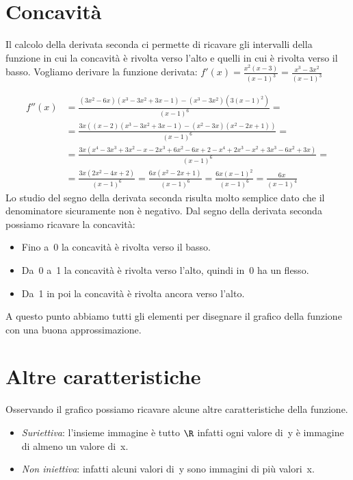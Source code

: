 \section{Concavità}
\label{sec:04_concavita}
Il calcolo della derivata seconda ci permette di ricavare gli intervalli 
della funzione in cui la concavità è rivolta verso l'alto e quelli in cui è 
rivolta verso il basso. Vogliamo derivare la funzione derivata:
\(f'(x)=\frac{x^2(x-3)}{(x-1)^3}=\frac{x^3-3x^2}{(x-1)^3}\)

\begin{align*}
f''(x) &= \frac{(3x^2 -6x)(x^3-3x^2+3x-1)-(x^3-3x^2)(3(x-1)^2)}{(x-1)^6} =\\
       &= \frac{3x((x -2)(x^3-3x^2+3x-1)-(x^2-3x)(x^2-2x+1))}{(x-1)^6} =\\
       &= \frac{3x(x^4-3x^3+3x^2-x-2x^3+6x^2-6x+2-x^4+2x^3-x^2+3x^3-6x^2+3x)}
               {(x-1)^6} =\\
       &= \frac{3x(2x^2-4x+2)}{(x-1)^6} = \frac{6x(x^2-2x+1)}{(x-1)^6} =
          \frac{6x(x-1)^2}{(x-1)^6} = \frac{6x}{(x-1)^4}
\end{align*}
Lo studio del segno della derivata seconda risulta molto semplice dato che il 
denominatore sicuramente non è negativo. 
Dal segno della derivata seconda possiamo ricavare la concavità:
\begin{center}
 \segnoderivatasecondaa
\end{center}

\begin{itemize} [nosep]
 \item Fino a~0 la concavità è rivolta verso il basso.
 \item Da~0 a~1 la concavità è rivolta verso l'alto, quindi in~0 ha un flesso.
 \item Da~1 in poi la concavità è rivolta ancora verso l'alto.
\end{itemize}

A questo punto abbiamo tutti gli elementi per disegnare il grafico della 
funzione con una buona approssimazione.
\begin{center} \tuttoassiemea \end{center}

\section{Altre caratteristiche}
\label{sec:altre_caratteristche}

% 
Osservando il grafico possiamo ricavare alcune altre caratteristiche della 
funzione.
\begin{itemize} [nosep]
 \item \emph{Suriettiva}: l'insieme immagine è tutto \(\R\) infatti ogni 
valore di~y è immagine di almeno un valore di~x.
 \item \emph{Non iniettiva}: infatti alcuni valori di~y sono immagini di più 
valori~x.
\end{itemize}

